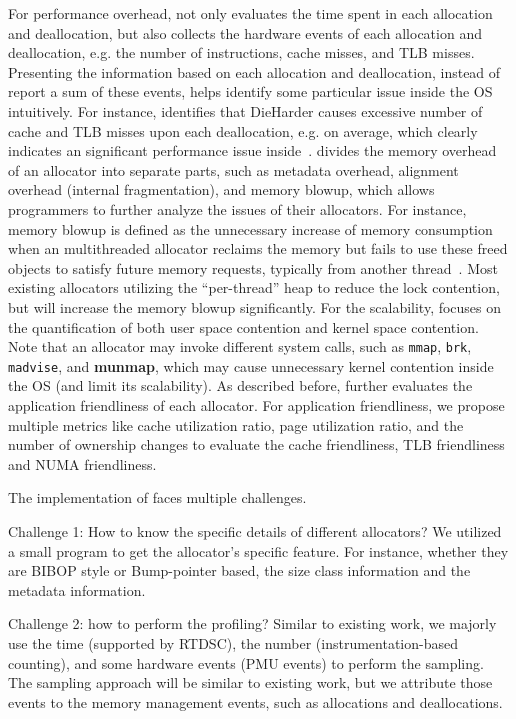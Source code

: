 For performance overhead, \MP{} not only evaluates the time spent in each allocation and deallocation, but also collects the hardware events of each allocation and deallocation, e.g. the number of instructions, cache misses, and TLB misses. Presenting the information based on each allocation and deallocation, instead of report a sum of these events, helps identify some particular issue inside the OS intuitively. For instance, \MP{} identifies that DieHarder causes excessive number of cache and TLB misses upon each deallocation, e.g.  on average,  which clearly indicates an significant performance issue inside~\cite{DieHarder, Guarder}. \MP{} divides the memory overhead of an allocator into separate parts, such as metadata overhead, alignment overhead (internal fragmentation), and memory blowup, which allows programmers to further analyze the issues of their allocators. For instance, memory blowup is defined as the unnecessary increase of memory consumption when an multithreaded allocator reclaims the memory but fails to use these freed objects to satisfy future memory requests, typically from another thread~\cite{Hoard}. Most existing allocators utilizing the ``per-thread'' heap to reduce the lock contention, but will increase the memory blowup significantly. For the scalability, \MP{} focuses on the quantification of both user space contention and kernel space contention. Note that an allocator may invoke different system calls, such as \texttt{mmap}, \texttt{brk}, \texttt{madvise}, and \textbf{munmap}, which may cause unnecessary kernel contention inside the OS (and limit its scalability). As described before, \MP{} further evaluates the application friendliness of each allocator. For application friendliness, we propose multiple metrics like cache utilization ratio, page utilization ratio, and the number of ownership changes to evaluate the cache friendliness, TLB friendliness and NUMA friendliness.     


The implementation of \MP{} faces multiple challenges.

 
Challenge 1: How to know the specific details of different allocators? We utilized a small program to get the allocator's specific feature. For instance, whether they are BIBOP style or Bump-pointer based, the size class information and the metadata information. 

Challenge 2: how to perform the profiling? Similar to existing work, we majorly use the time (supported by RTDSC), the number (instrumentation-based counting), and some hardware events (PMU events) to perform the sampling. The sampling approach will be similar to existing work, but we attribute those events to the memory management events, such as allocations and deallocations. 

